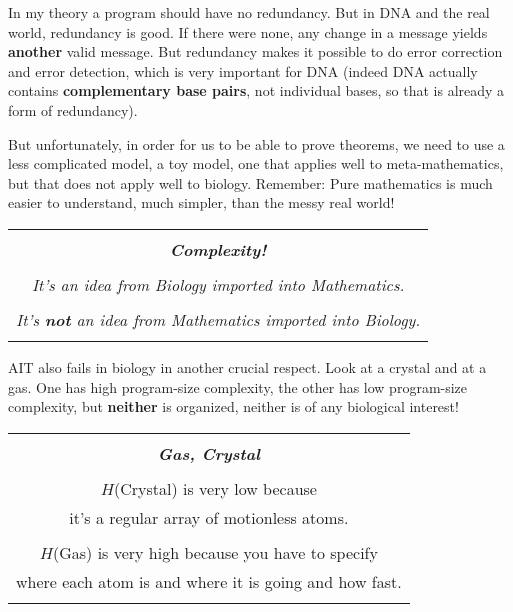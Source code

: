 \documentclass[12pt]{book}
\begin{document}
In my theory a program should have no redundancy. But in DNA and the real world,
redundancy is good. If there were none, any change in a message yields \textbf{another}
valid message. But redundancy makes it possible to do error correction and error detection,
which is very important for DNA (indeed DNA
actually contains \textbf{complementary base pairs}, not individual bases, so that is already
a form of redundancy).
 
But unfortunately, in order for us to
be able to prove theorems,
we need to use a less complicated model, a toy model, one that applies well to meta-mathematics, 
but that does not apply well to biology.
Remember:
Pure mathematics is much easier to understand, much simpler, than the messy real world!
 
\begin{center}
\begin{tabular}{|c|}
\hline
\\
\textbf{\emph{\large Complexity!}}
\\ \\
\emph{It's an idea from Biology imported into Mathematics.}
\\ \\
\emph{It's \textbf{not} an idea from Mathematics imported into Biology.}
\\
\\
\hline
\end{tabular}
\end{center}
 
AIT also fails in biology in another crucial respect.
Look at a crystal and at a gas.  One has high program-size complexity, the other has low
program-size complexity, but \textbf{neither} is organized, neither is of any biological interest!
 
\begin{center}
\begin{tabular}{|c|}
\hline
\\
\textbf{\large \emph{Gas, Crystal}}
\\ \\
$H$(Crystal) is very low because 
\\
it's a regular array of motionless atoms.
\\ \\
$H$(Gas) is very high because 
you have to specify 
\\
where each atom is and where it is going
and how fast.
\\
\\
\hline
\end{tabular}
\end{center}
 
\end{document}
